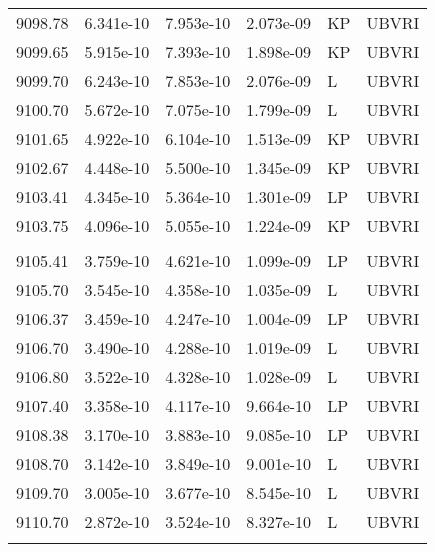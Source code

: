 \begin{center}
\begin{tabular} {l l c c l l}
   9098.78  &  6.341e-10  &  7.953e-10  &  2.073e-09 &  KP &UBVRI  \\
   9099.65  &  5.915e-10  &  7.393e-10  &  1.898e-09 &  KP &UBVRI  \\
   9099.70  &  6.243e-10  &  7.853e-10  &  2.076e-09 &  L &UBVRI  \\
   9100.70  &  5.672e-10  &  7.075e-10  &  1.799e-09 &  L &UBVRI  \\
   9101.65  &  4.922e-10  &  6.104e-10  &  1.513e-09 &  KP &UBVRI  \\
   9102.67  &  4.448e-10  &  5.500e-10  &  1.345e-09 &  KP &UBVRI  \\
   9103.41  &  4.345e-10  &  5.364e-10  &  1.301e-09 &  LP  &UBVRI  \\
   9103.75  &  4.096e-10  &  5.055e-10  &  1.224e-09 &  KP &UBVRI  \\
 \\
   9105.41  &  3.759e-10  &  4.621e-10  &  1.099e-09 &  LP  &UBVRI  \\
   9105.70  &  3.545e-10  &  4.358e-10  &  1.035e-09 &  L &UBVRI  \\
   9106.37  &  3.459e-10  &  4.247e-10  &  1.004e-09 &  LP  &UBVRI  \\
   9106.70  &  3.490e-10  &  4.288e-10  &  1.019e-09 &  L &UBVRI  \\
   9106.80  &  3.522e-10  &  4.328e-10  &  1.028e-09 &  L &UBVRI  \\
   9107.40  &  3.358e-10  &  4.117e-10  &  9.664e-10 &  LP  &UBVRI  \\
   9108.38  &  3.170e-10  &  3.883e-10  &  9.085e-10 &  LP  &UBVRI  \\
   9108.70  &  3.142e-10  &  3.849e-10  &  9.001e-10 &  L &UBVRI  \\
   9109.70  &  3.005e-10  &  3.677e-10  &  8.545e-10 &  L &UBVRI  \\
   9110.70  &  2.872e-10  &  3.524e-10  &  8.327e-10 &  L &UBVRI  \\
 \\
\hline
\end{tabular}
\end{center}

\vfill
\eject


